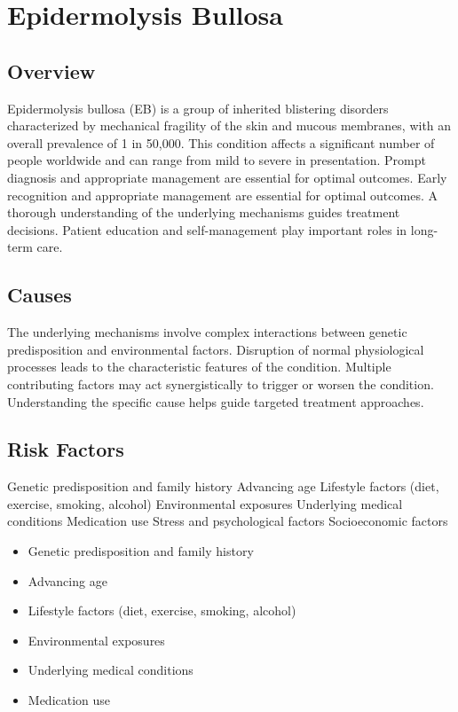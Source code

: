 \chapter{Epidermolysis Bullosa}
\label{sec:Epidermolysis Bullosa}

\section{Overview}
Epidermolysis bullosa (EB) is a group of inherited blistering disorders characterized by mechanical fragility of the skin and mucous membranes, with an overall prevalence of 1 in 50,000. This condition affects a significant number of people worldwide and can range from mild to severe in presentation. Prompt diagnosis and appropriate management are essential for optimal outcomes. Early recognition and appropriate management are essential for optimal outcomes. A thorough understanding of the underlying mechanisms guides treatment decisions. Patient education and self-management play important roles in long-term care.
\section{Causes}
The underlying mechanisms involve complex interactions between genetic predisposition and environmental factors. Disruption of normal physiological processes leads to the characteristic features of the condition. Multiple contributing factors may act synergistically to trigger or worsen the condition. Understanding the specific cause helps guide targeted treatment approaches.
\section{Risk Factors}
Genetic predisposition and family history Advancing age Lifestyle factors (diet, exercise, smoking, alcohol) Environmental exposures Underlying medical conditions Medication use Stress and psychological factors Socioeconomic factors

\begin{itemize}[noitemsep]
  \item Genetic predisposition and family history
  \item Advancing age
  \item Lifestyle factors (diet, exercise, smoking, alcohol)
  \item Environmental exposures
  \item Underlying medical conditions
  \item Medication use
\end{itemize}
